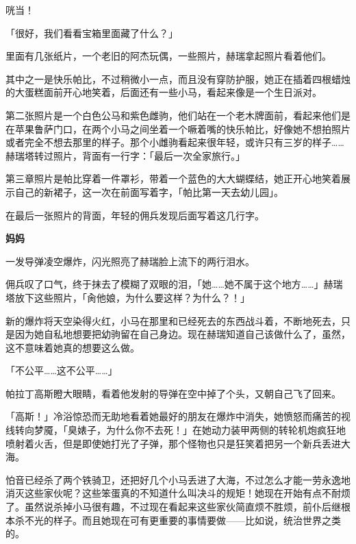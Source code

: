 咣当！

「很好，我们看看宝箱里面藏了什么？」

里面有几张纸片，一个老旧的阿杰玩偶，一些照片，赫瑞拿起照片看着他们。

其中之一是快乐帕比，不过稍微小一点，而且没有穿防护服，她正在插着四根蜡烛的大蛋糕面前开心地笑着，后面还有一些小马，看起来像是一个生日派对。

第二张照片是一个白色公马和紫色雌驹，他们站在一个老木牌面前，看起来他们是在苹果鲁萨门口，在两个小马之间坐着一个噘着嘴的快乐帕比，好像她不想拍照片或者完全不想去那里的样子。那个小雌驹看起来很年轻，或许只有三岁的样子……赫瑞塔转过照片，背面有一行字：「最后一次全家旅行。」

第三章照片是帕比穿着一件罩衫，带着一个蓝色的大大蝴蝶结，她正开心地笑着展示自己的新裙子，这一次在前面写着字，「帕比第一天去幼儿园」。

在最后一张照片的背面，年轻的佣兵发现后面写着这几行字。

\medskip



\begin{flushright}
    \textbf{妈妈}
\end{flushright}

\medskip

一发导弹凌空爆炸，闪光照亮了赫瑞脸上流下的两行泪水。

佣兵叹了口气，终于抹去了模糊了双眼的泪，「她……她不属于这个地方……」赫瑞塔放下这些照片，「肏他娘，为什么要这样？为什么？！」

新的爆炸将天空染得火红，小马在那里和已经死去的东西战斗着，不断地死去，只是因为她自私地想要把幼驹留在自己身边。现在赫瑞知道自己该做什么了，虽然，这不意味着她真的想要这么做。

「不公平……这不公平……」

\horizonline

帕拉丁高斯瞪大眼睛，看着他发射的导弹在空中掉了个头，又朝自己飞了回来。

「高斯！」冷浴惊恐而无助地看着她最好的朋友在爆炸中消失，她愤怒而痛苦的视线转向梦魇，「臭婊子，为什么你不去死！」在她动力装甲两侧的转轮机炮疯狂地喷射着火舌，但是即使她打光了子弹，那个怪物也只是狂笑着把另一个新兵丢进大海。

怕音已经杀了两个铁骑卫，还把好几个小马丢进了大海，不过怎么才能一劳永逸地消灭这些家伙呢？这些笨蛋真的不知道什么叫决斗的规矩！她现在开始有点不耐烦了。虽然说杀掉小马很有趣，不过现在看起来这些家伙简直烦不胜烦，前仆后继根本杀不光的样子。而且她现在可有更重要的事情要做——比如说，统治世界之类的。


